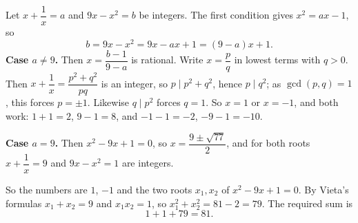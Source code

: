 Let $x+\dfrac{1}{x}=a$ and $9x-x^2=b$ be integers. The first condition gives $x^2=ax-1$, so
\[b=9x-x^2=9x-ax+1=(9-a)x+1 .\]
\textbf{Case $a\ne9$.} Then $x=\dfrac{b-1}{9-a}$ is rational. Write $x=\dfrac {p}{q}$ in lowest terms with $q>0$. Then $x+\dfrac{1}{x}=\dfrac{p^2+q^2}{pq}$ is an integer, so $p\mid p^2+q^2$, hence $p\mid q^2$; as $\gcd(p,q)=1$, this forces $p=\pm1$. Likewise $q\mid p^2$ forces $q=1$. So $x=1$ or $x=-1$, and both work: $1+1=2$, $9-1=8$, and $-1-1=-2$, $-9-1=-10$.

\textbf{Case $a=9$.} Then $x^2-9x+1=0$, so $x=\dfrac{9\pm\sqrt{77}}{2}$, and for both roots $x+\dfrac{1}{x}=9$ and $9x-x^2=1$ are integers.

So the numbers are $1$, $-1$ and the two roots $x_1,x_2$ of $x^2-9x+1=0$. By Vieta's formulas $x_1+x_2=9$ and $x_1x_2=1$, so $x_1^2+x_2^2=81-2=79$. The required sum is
\[1+1+79=\boxed{81}.\]

